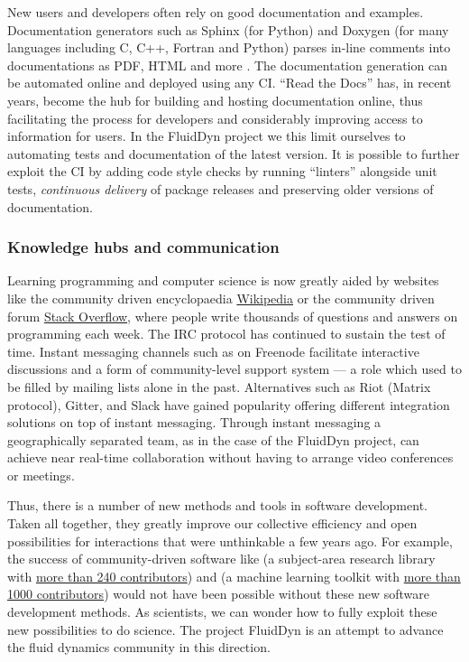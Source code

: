 New users and developers often rely on good documentation and examples.
Documentation generators such as Sphinx (for Python) and Doxygen (for many
languages including C, C++, Fortran and Python) parses in-line comments into
documentations as PDF, HTML and more \citep{lee_ten_2018}.
%
The documentation generation can be automated online and deployed using any CI.
``Read the Docs'' has, in recent years, become the hub for building and hosting
documentation online, thus facilitating the process for developers and
considerably improving access to information for users.
%
In the FluidDyn project we this limit ourselves to automating tests and
documentation of the latest version. It is possible to further exploit the
CI by adding code style checks by running ``linters'' alongside unit tests,
\emph{continuous delivery} of package releases and preserving older versions of
documentation.

\subsubsection{Knowledge hubs and communication}

%
Learning programming and computer science is now greatly aided by websites like
the community driven encyclopaedia \href{https://www.wikipedia.org/}{Wikipedia}
or the community driven forum \href{https://stackoverflow.com/}{Stack
Overflow}, where people write thousands of questions and answers on programming
each week. The IRC protocol has continued to sustain the test of time. Instant
messaging channels such as  on Freenode facilitate
interactive discussions and a form of community-level support system --- a role
which used to be filled by mailing lists alone in the past. Alternatives such
as Riot (Matrix protocol), Gitter, and Slack have gained popularity offering
different integration solutions on top of instant messaging.
%
Through instant messaging a geographically separated team, as in the case of
the FluidDyn project, can achieve near real-time collaboration without having
to arrange video conferences or meetings.

Thus, there is a number of new methods and tools in software development.
Taken all together, they greatly improve our collective efficiency and
open possibilities for interactions that were unthinkable a few years ago.
%
For example, the success of community-driven software like  (a
subject-area research library with
\href{https://github.com/astropy/astropy}{more than 240 contributors}) and
 (a machine learning toolkit with
\href{https://github.com/scikit-learn/scikit-learn}{more than 1000
contributors}) would not have been possible without these new software
development methods.
%
As scientists, we can wonder how to fully exploit these new possibilities to do
science. The project FluidDyn is an attempt to advance the fluid dynamics
community in this direction.



